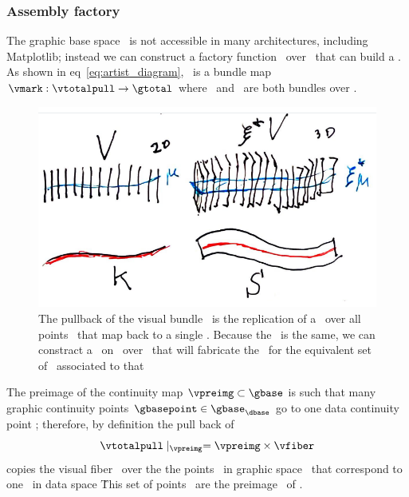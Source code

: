 \documentclass[../main.tex]{subfiles}
\begin{document}
\subsubsection{Assembly factory \vmarkd}
The graphic base space \gbase\ is not accessible in many architectures, including Matplotlib; instead we can construct a factory function \vmarkd\ over \dbase\ that can build a \vmark. As shown in eq~\ref{eq:artist_diagram}, \vmark\ is a bundle map $\vmark: \vtotalpull\rightarrow \gtotal$ where \vtotalpull\ and \gtotal\ are both bundles over \gbase.
\begin{figure}[H]
    \includegraphics[width=.75\textwidth]{figures/math/q_hat.png}
    \caption{The pullback of the visual bundle \vtotalpull\ is the replication of a \vsection\ over all points \gbasepoint\ that map back to a single \dbasepoint. Because the \vsection\ is the same, we can constract a \vmarkd\ on \vsection\ over \dbasepoint\ that will fabricate the \vmark\ for the equivalent set of \gbasepoint\ associated to that \dbasepoint}
    \label{fig:artist_q_hat}
\end{figure}
 
The preimage of the continuity map $\vpreimg \subset \gbase$ is such that many graphic continuity points $\gbasepoint \in \gbase_{\dbase}$ go to one data continuity point \dbasepoint; therefore, by definition the pull back of \vsection\
\begin{equation}
    \vtotalpull \mid_{\vpreimg} = \vpreimg \times \vfiber
\end{equation}
copies the visual fiber \vfiber\ over the the points \gbasepoint\ in graphic space \gbase\ that correspond to one \dbasepoint\ in data space \dbase\. This set of points \gbasepoint\ are the preimage \vpreimg\ of \dbasepoint. 
\end{document}
